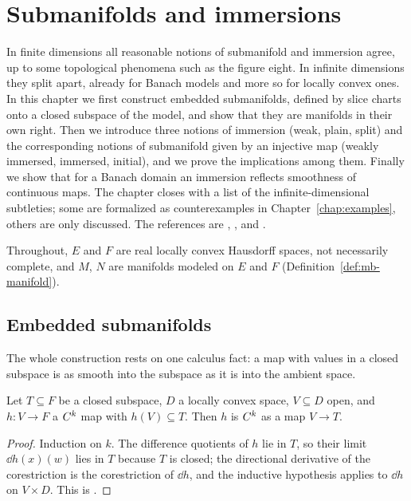 \chapter{Submanifolds and immersions}
\label{chap:submanifolds}

In finite dimensions all reasonable notions of submanifold and immersion agree, up to some
topological phenomena such as the figure eight. In infinite dimensions they split apart, already
for Banach models and more so for locally convex ones. In this chapter we first construct
embedded submanifolds, defined by slice charts onto a closed subspace of the model, and show that
they are manifolds in their own right. Then we introduce three notions of immersion (weak,
plain, split) and the corresponding notions of submanifold given by an injective map (weakly
immersed, immersed, initial), and we prove the implications among them. Finally we show that
for a Banach domain an immersion reflects smoothness of continuous maps. The chapter closes with
a list of the infinite-dimensional subtleties; some are formalized as counterexamples in
Chapter~\ref{chap:examples}, others are only discussed. The references are
\cite[Def.~3.1.10, Def.~3.3.22, Rem.~3.3.23, Lemma~3.3.24]{GN26}, \cite[\S II.6, \S IV.4]{Nee06},
\cite{KMW22} and \cite[Cap.~2]{Lar22}.

Throughout, $E$ and $F$ are real locally convex Hausdorff spaces, not necessarily complete, and
$M$, $N$ are manifolds modeled on $E$ and $F$ (Definition~\ref{def:mb-manifold}).

\section{Embedded submanifolds}

The whole construction rests on one calculus fact: a map with values in a closed subspace is as
smooth into the subspace as it is into the ambient space.

\begin{lemma}
  \label{lem:sub-codrestrict}
  \leanok
  Let $T \subseteq F$ be a closed subspace, $D$ a locally convex space, $V \subseteq D$ open,
  and $h \colon V \to F$ a
  $C^{k}$ map with $h(V) \subseteq T$. Then $h$ is $C^{k}$ as a map $V \to T$.
\end{lemma}

\begin{proof}
  \leanok
  Induction on $k$. The difference quotients of $h$ lie in $T$, so their limit $\dd h(x)(w)$
  lies in $T$ because $T$ is closed; the directional derivative of the corestriction is the
  corestriction of $\dd h$, and the inductive hypothesis applies to $\dd h$ on $V \times D$.
  This is \cite[Lemma~1.3.19]{GN26}.
\end{proof}

